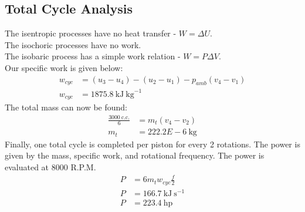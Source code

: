 \documentclass[10pt,a4paper]{article}
\begin{document}
	\subsection{Total Cycle Analysis}
	The isentropic processes have no heat transfer - $W = \Delta U$.\\
	The isochoric processes have no work.\\
	The isobaric process has a simple work relation - $W = P \Delta V$.\\
	Our specific work is given below:
	\begin{align}
		w_{cyc} &= (u_3-u_4) - (u_2-u_1) - p_{amb}(v_4 - v_1) \\
		w_{cyc} &= 1875.8\ \text{kJ}\ \text{kg}^{-1}
	\end{align}
	The total mass can now be found:
	\begin{align}
		\frac{3000\ \text{c.c.}}{6} &= m_t(v_4-v_2)\\
		m_t &= 222.2E-6\ \text{kg}
	\end{align}
	Finally, one total cycle is completed per piston for every 2 rotations. The power is given by the mass, specific work, and rotational frequency. The power is evaluated at 8000 R.P.M.
	\begin{align}
		P &= 6 m_t w_{cyc} \frac{f}{2}\\
		P &= 166.7\ \text{kJ}\ \text{s}^{-1}\\
		P &= 223.4\ \text{hp}
	\end{align}
\end{document}
